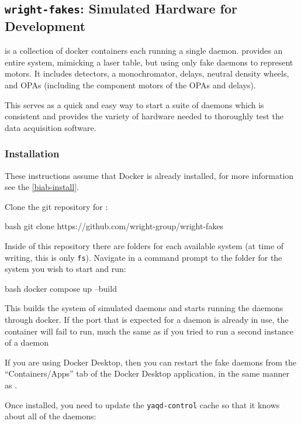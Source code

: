 \subsection{\texttt{wright-fakes}: Simulated Hardware for Development}
\label{wright-fakes}

\wrightfakes is a collection of docker containers each running a single \yaq daemon.
\wrightfakes provides an entire system, mimicking a laser table, but using only fake daemons to represent motors.
It includes detectors, a monochromator, delays, neutral density wheels, and OPAs (including the component motors of the OPAs and delays).

This serves as a quick and easy way to start a suite of \yaq daemons which is consistent and provides the variety of hardware needed to thoroughly test the data acquisition software.

\subsubsection{Installation}
These instructions assume that Docker is already installed, for more information see the \ref{biab-install}.


Clone the git repository for \wrightfakes:

\begin{codefragment}{bash}
git clone https://github.com/wright-group/wright-fakes
\end{codefragment}

Inside of this repository there are folders for each available system (at time of writing, this is only \texttt{fs}).
Navigate in a command prompt to the folder for the system you wish to start and run:

\begin{codefragment}{bash}
docker compose up --build
\end{codefragment}

This builds the system of simulated daemons and starts running the daemons through docker.
If the port that is expected for a \yaq daemon is already in use, the container will fail to run, much the same as if you tried to run a second instance of a \yaq daemon


If you are using Docker Desktop, then you can restart the fake daemons from the ``Containers/Apps'' tab of the Docker Desktop application, in the same manner as \biab.

Once installed, you need to update the \texttt{yaqd-control} cache so that it knows about all of the daemons:

